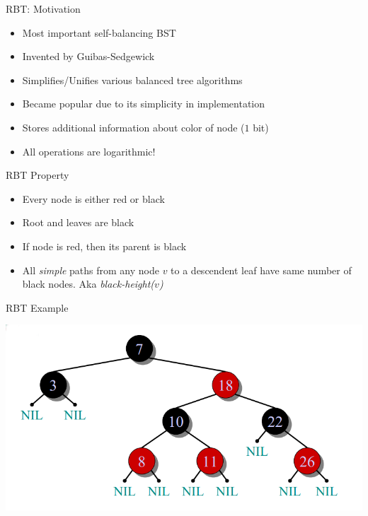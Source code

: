 \documentclass{beamer}
\begin{document}
\begin{frame}{RBT: Motivation}
    \begin{itemize}
        \item Most important self-balancing BST
        \item Invented by Guibas-Sedgewick
        \item Simplifies/Unifies various balanced tree algorithms
        \item Became popular due to its simplicity in implementation
        \item Stores additional information about color of node ($1$ bit)
        \item All operations are logarithmic!
    \end{itemize}
\end{frame}


\begin{frame}{RBT Property}
    \begin{itemize}
        \item Every node is either red or black
        \item Root and leaves are black
        \item If node is red, then its parent is black
        \item All {\em simple} paths from any node $v$ to a descendent leaf have same number of black nodes. Aka {\em black-height($v$)}
    \end{itemize}
\end{frame}


\begin{frame}{RBT Example}
    \begin{center}
        \includegraphics[scale=0.4]{rbtEg1.png}
    \end{center}
\end{frame}
\end{document}
